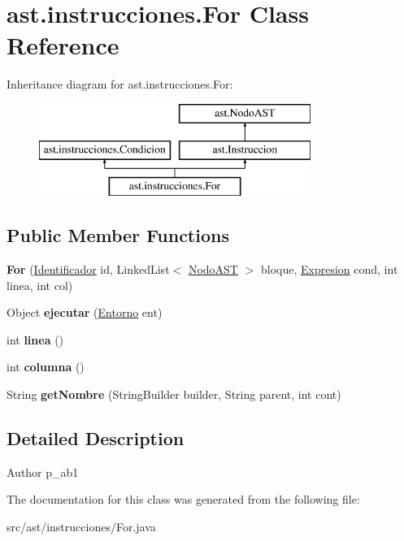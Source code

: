 \hypertarget{classast_1_1instrucciones_1_1_for}{}\section{ast.\+instrucciones.\+For Class Reference}
\label{classast_1_1instrucciones_1_1_for}
Inheritance diagram for ast.\+instrucciones.\+For\+:\begin{figure}[H]
\begin{center}
\leavevmode
\includegraphics[height=3.000000cm]{classast_1_1instrucciones_1_1_for}
\end{center}
\end{figure}
\subsection*{Public Member Functions}
\begin{DoxyCompactItemize}
\item 
\mbox{\label{classast_1_1instrucciones_1_1_for_a8190489ef00a07fdf329f2392878e9e9}} 
{\bfseries For} (\mbox{\hyperlink{classast_1_1expresiones_1_1_identificador}{Identificador}} id, Linked\+List$<$ \mbox{\hyperlink{interfaceast_1_1_nodo_a_s_t}{Nodo\+A\+ST}} $>$ bloque, \mbox{\hyperlink{interfaceast_1_1_expresion}{Expresion}} cond, int linea, int col)
\item 
\mbox{\label{classast_1_1instrucciones_1_1_for_ae8a21c62e52ecdef168ed441ac4775fb}} 
Object {\bfseries ejecutar} (\mbox{\hyperlink{classentorno_1_1_entorno}{Entorno}} ent)
\item 
\mbox{\label{classast_1_1instrucciones_1_1_for_a9ed05f6111604bdaa432d0376297d9de}} 
int {\bfseries linea} ()
\item 
\mbox{\label{classast_1_1instrucciones_1_1_for_a16740f86f0eec252fcb4348099be27eb}} 
int {\bfseries columna} ()
\item 
\mbox{\label{classast_1_1instrucciones_1_1_for_ac6acbe31ca33914f7041f3b1659dc436}} 
String {\bfseries get\+Nombre} (String\+Builder builder, String parent, int cont)
\end{DoxyCompactItemize}


\subsection{Detailed Description}
\begin{DoxyAuthor}{Author}
p\+\_\+ab1 
\end{DoxyAuthor}


The documentation for this class was generated from the following file\+:\begin{DoxyCompactItemize}
\item 
src/ast/instrucciones/For.\+java\end{DoxyCompactItemize}
